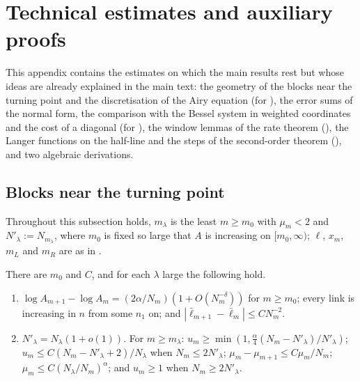 \appendix
{}

\section{Technical estimates and auxiliary proofs}\label{app:routine}

This appendix contains the estimates on which the main results rest but whose ideas are already
explained in the main text: the geometry of the blocks near the turning point and the discretisation
of the Airy equation (for ), the error sums of the normal form, the comparison with
the Bessel system in weighted coordinates and the cost of a diagonal (for ), the
window lemmas of the rate theorem (), the Langer functions on the half-line and the
steps of the second-order theorem (), and two algebraic derivations.

\subsection{Blocks near the turning point}

Throughout this subsection  holds, $m_\lambda$ is the least $m\ge m_0$ with $\mu_m<2$
and $N'_\lambda:=N_{m_\lambda}$, where $m_0$ is fixed so large that $A$ is increasing on
$[m_0,\infty)$; $\ell$, $x_m$, $m_L$ and $m_R$ are as in .

\begin{lemma}\label{lem:geometry}
There are $m_0$ and $C$, and for each $\lambda$ large the following hold.
\begin{enumerate}
\item[(a)] $\log A_{m+1}-\log A_m=(2\alpha/N_m)(1+O(N_m^{-\delta}))$ for $m\ge m_0$; every link is
  increasing in $n$ from some $n_1$ on; and $|\bar\ell_{m+1}-\bar\ell_m|\le CN_m^{-2}$.
\item[(b)] $N'_\lambda=N_\lambda(1+o(1))$. For $m\ge m_\lambda$: $u_m\ge\min(1,\frac\alpha4(N_m-N'_\lambda)/N'_\lambda)$;
  $u_m\le C(N_m-N'_\lambda+2)/N_\lambda$ when $N_m\le2N'_\lambda$; $\mu_m-\mu_{m+1}\le C\mu_m/N_m$;
  $\mu_m\le C(N_\lambda/N_m)^\alpha$; and $u_m\ge1$ when $N_m\ge2N'_\lambda$.
\end{enumerate}
\end{lemma}

